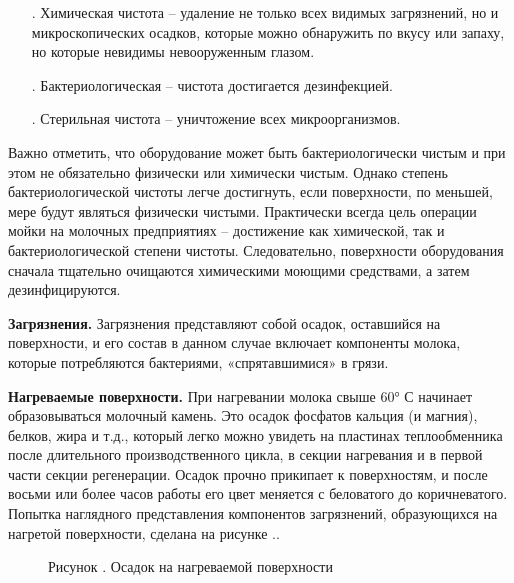 {\begin{itemize}[leftmargin=2.15cm, labelwidth=0.65cm, labelsep=0.0cm]
	\item[\theitemcntr. ] Химическая чистота {--} удаление не только всех видимых загрязнений, но и микроскопических осадков, которые можно обнаружить по вкусу или запаху, но которые невидимы невооруженным глазом.
	\addtocounter{itemcntr}{1}
	
	\item[\theitemcntr. ] Бактериологическая {--} чистота достигается дезинфекцией.
	\addtocounter{itemcntr}{1}
	
	\item[\theitemcntr. ] Стерильная чистота {--} уничтожение всех микроорганизмов.
	\addtocounter{itemcntr}{1}
	
	\setcounter{itemcntr}{1}
\end{itemize}

\par \redline Важно отметить, что оборудование может быть бактериологически чистым и при этом не
обязательно физически или химически чистым. Однако степень бактериологической чистоты
легче достигнуть, если поверхности, по меньшей, мере будут являться физически чистыми.
Практически всегда цель операции мойки на молочных предприятиях {--} достижение как
химической, так и бактериологической степени чистоты. Следовательно, поверхности
оборудования сначала тщательно очищаются химическими моющими средствами, а затем
дезинфицируются.


\par \redline \textbf{Загрязнения.} Загрязнения представляют собой осадок, оставшийся на поверхности, и его состав в данном случае включает компоненты молока, которые потребляются бактериями, «спрятавшимися» в грязи.

\par \redline \textbf{Нагреваемые поверхности.} При нагревании молока свыше 60° С начинает образовываться молочный камень.
Это осадок фосфатов кальция (и магния), белков, жира и т.д., который легко можно увидеть на пластинах теплообменника после длительного производственного цикла, в секции нагревания и в первой части секции регенерации. Осадок прочно прикипает к поверхностям, и после восьми или более часов работы его цвет меняется с беловатого до коричневатого. Попытка наглядного представления компонентов загрязнений, образующихся на нагретой поверхности, сделана на рисунке \thechaptercntr .\theimagecntr.

\begin{figure}[htb]
	\centering
	\def\svgwidth{\textwidth}
	
	\caption*{\gostFont Рисунок \thechaptercntr .\theimagecntr \spc {--} Осадок на нагреваемой поверхности}
	\label{fig:ris1}
\end{figure}

}
